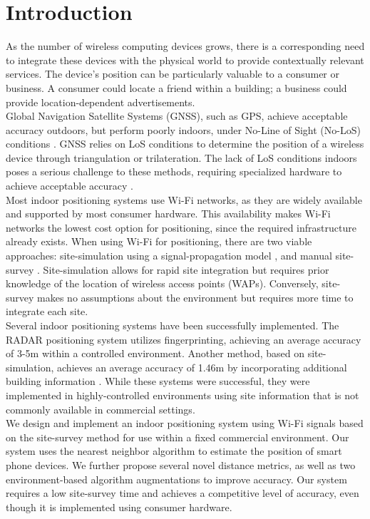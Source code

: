 \documentclass[conference]{IEEEtran}
\begin{document}
\section{Introduction}
As the number of wireless computing devices grows, there is a corresponding need to integrate these devices with the physical world to provide contextually relevant services. The device's position can be particularly valuable to a consumer or business. A consumer could locate a friend within a building; a business could provide location-dependent advertisements.\\
\indent Global Navigation Satellite Systems (GNSS), such as GPS, achieve acceptable accuracy outdoors, but perform poorly indoors, under No-Line of Sight (No-LoS) conditions  \cite{Lakmali}. GNSS relies on LoS conditions to determine the position of a wireless device through triangulation or trilateration. The lack of LoS conditions indoors poses a serious challenge to these methods, requiring specialized hardware to achieve acceptable accuracy \cite{Liu}. \\
\indent Most indoor positioning systems use Wi-Fi networks, as they are widely available and supported by most consumer hardware. This availability makes Wi-Fi networks the lowest cost option for positioning, since the required infrastructure already exists. When using Wi-Fi for positioning, there are two viable approaches: site-simulation using a signal-propagation model \cite{Kokkinis}, and manual site-survey \cite{Chaudhuri}. Site-simulation allows for rapid site integration but requires prior knowledge of the location of wireless access points (WAPs). Conversely, site-survey makes no assumptions about the environment but requires more time to integrate each site. \\
\indent Several indoor positioning systems have been successfully implemented. The RADAR positioning system \cite{Bahl} utilizes fingerprinting, achieving an average accuracy of 3-5m within a controlled environment. Another method, based on site-simulation, achieves an average accuracy of 1.46m by incorporating additional building information \cite{Kokkinis}. While these systems were successful, they were implemented in highly-controlled environments using site information that is not commonly available in commercial settings.\\
\indent We design and implement an indoor positioning system using Wi-Fi signals based on the site-survey method for use within a fixed commercial environment. Our system uses the nearest neighbor algorithm to estimate the position of smart phone devices. We further propose several novel distance metrics, as well as two environment-based algorithm augmentations to improve accuracy. Our system requires a low site-survey time and achieves a competitive level of accuracy, even though it is implemented using consumer hardware.\\
\end{document}
